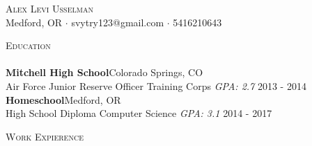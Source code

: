\documentclass[a4paper]{article}
\newcommand{\lineunder} {
    \vspace*{-8pt} \\
    \hspace*{-18pt} \hrulefill \\
}
\newcommand{\header} [1] {
    {\hspace*{-18pt}\vspace*{6pt} \textsc{#1}}
    \vspace*{-6pt} \lineunder
}
\begin{document}
\vspace*{-40pt}

    

\vspace*{-10pt}
\begin{center}
	{\Huge \scshape {Alex Levi Usselman}}\\
	Medford, OR $\cdot$ svytry123@gmail.com $\cdot$ 5416210643\\
\end{center}

\header{Education}
\textbf{Mitchell High School}\hfill Colorado Springs, CO\\
Air Force Junior Reserve Officer Training Corps \textit{GPA: 2.7} \hfill 2013 - 2014\\
\vspace{2mm}
\textbf{Homeschool}\hfill Medford, OR\\
High School Diploma Computer Science \textit{GPA: 3.1} \hfill 2014 - 2017\\
\vspace{2mm}

\header{Work Expierence}
\vspace{1mm}
\end{document}
